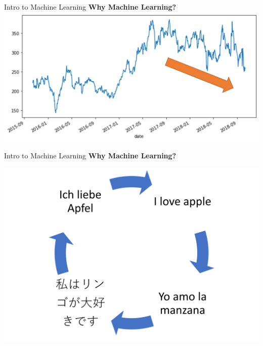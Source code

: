 \documentclass{beamer}
\begin{document}
\begin{frame}[fragile]{Intro to Machine Learning}
    \textbf{Why Machine Learning?}
    \includegraphics[width=\textwidth,height=\textheight,keepaspectratio]{figures/Stock_trend.png}
\end{frame}
\begin{frame}[fragile]{Intro to Machine Learning}
    \textbf{Why Machine Learning?}
    \begin{center}
        \includegraphics[width=\textwidth,height=0.8\textheight,keepaspectratio]{figures/Lang_1.png}
    \end{center}
\end{frame}
\end{document}

